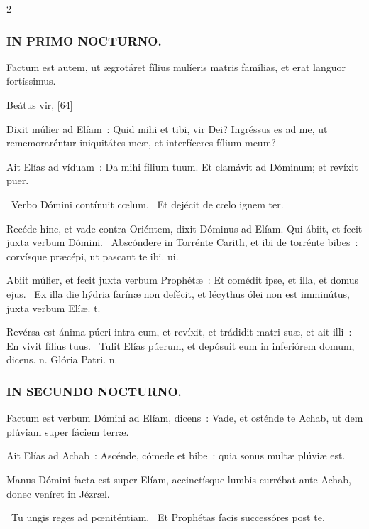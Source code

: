 \documentclass[9pt,twoside]{extarticle}
\begin{document}
\begin{multicols}{2}
{\subsubsection*{\center \textsc{IN PRIMO NOCTURNO.}}
\begin{tightlist}{}
\item {} Factum est autem, ut ægrotáret fílius mulíeris matris famílias, et erat languor fortíssimus.
\item {} Beátus vir,  [64]
\item {} Dixit múlier ad Elíam~: Quid mihi et tibi, vir Dei? Ingréssus es ad me, ut rememoraréntur iniquitátes meæ, et interfíceres fílium meum?
\item {} Ait Elías ad víduam~: Da mihi fílium tuum. Et clamávit ad Dóminum; et revíxit puer.
\item {}~Verbo Dómini contínuit cœlum. ~Et dejécit de cœlo ignem ter.
\item {}
\item {} Recéde hinc, et vade contra Oriéntem, dixit Dóminus ad Elíam. \textred{*} Qui ábiit, et fecit juxta verbum Dómini. ~Abscóndere in Torrénte Carith, et ibi de torrénte bibes~: corvísque præcépi, ut pascant te ibi. ui.
\item {} Abiit múlier, et fecit juxta verbum Prophétæ~: \textred{*} Et comédit ipse, et illa, et domus ejus. ~Ex illa die hýdria farínæ non defécit, et lécythus ólei non est imminútus, juxta verbum Elíæ. t.
\item {} Revérsa est ánima púeri intra eum, et revíxit, et trádidit matri suæ, et ait illi~: \textred{*} En vivit fílius tuus. ~Tulit Elías púerum, et depósuit eum in inferiórem domum, dicens. n. Glória Patri. n.
\end{tightlist}

\subsubsection*{\center \textsc{IN SECUNDO NOCTURNO.}}
\begin{tightlist}{}
\item {} Factum est verbum Dómini ad Elíam, dicens~: Vade, et osténde te Achab, ut dem plúviam super fáciem terræ.
\item {} Ait Elías ad Achab~: Ascénde, cómede et bibe~: quia sonus multæ plúviæ est.
\item {} Manus Dómini facta est super Elíam, accinctísque lumbis currébat ante Achab, donec veníret in Jézræl.
\item {}~Tu ungis reges ad pœniténtiam. ~Et Prophétas facis successóres post te.
\end{tightlist}

}
\end{multicols}
\end{document}
